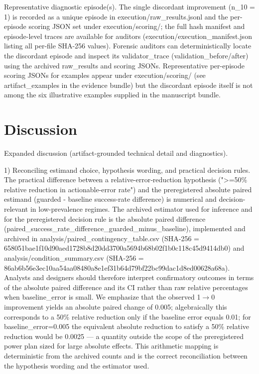\documentclass[conference]{IEEEtran}
\begin{document}
Representative diagnostic episode(s). The single discordant improvement (n\_10 = 1) is recorded as a unique episode in execution/raw\_results.jsonl and the per-episode scoring JSON set under execution/scoring/; the full hash manifest and episode-level traces are available for auditors (execution/execution\_manifest.json listing all per-file SHA-256 values). Forensic auditors can deterministically locate the discordant episode and inspect its validator\_trace (validation\_before/after) using the archived raw\_results and scoring JSONs. Representative per-episode scoring JSONs for examples appear under execution/scoring/ (see artifact\_examples in the evidence bundle) but the discordant episode itself is not among the six illustrative examples supplied in the manuscript bundle.

\section{Discussion}
Expanded discussion (artifact-grounded technical detail and diagnostics).

1) Reconciling estimand choice, hypothesis wording, and practical decision rules. The practical difference between a relative-error‑reduction hypothesis (">=50\% relative reduction in actionable-error rate") and the preregistered absolute paired estimand (guarded - baseline success-rate difference) is numerical and decision-relevant in low-prevalence regimes. The archived estimator used for inference and for the preregistered decision rule is the absolute paired difference (paired\_success\_rate\_difference\_guarded\_minus\_baseline), implemented and archived in analysis/paired\_contingency\_table.csv (SHA-256 = 658051bae1f10d90aed1728b8d20dd3700a5694b68b02f1b0c118c45d9414db0) and analysis/condition\_summary.csv (SHA-256 = 86ab6b56e3ec10aa54aa08480a8e1ef31b64d79bf22bc99dac1d8ed00628a68a). Analysts and designers should therefore interpret confirmatory outcomes in terms of the absolute paired difference and its CI rather than raw relative percentages when baseline\_error is small. We emphasize that the observed 1\ensuremath{\rightarrow}0 improvement yields an absolute paired change of 0.005; algebraically this corresponds to a 50\% relative reduction only if the baseline error equals 0.01; for baseline\_error=0.005 the equivalent absolute reduction to satisfy a 50\% relative reduction would be 0.0025 --- a quantity outside the scope of the preregistered power plan sized for large absolute effects. This arithmetic mapping is deterministic from the archived counts and is the correct reconciliation between the hypothesis wording and the estimator used.
\end{document}
